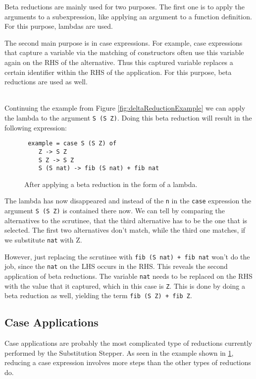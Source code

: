 Beta reductions are mainly used for two purposes.
The first one is to apply the arguments to a subexpression,
like applying an argument to a function definition.
For this purpose, lambdas are used.

The second main purpose is in case expressions.
For example, case expressions that capture a variable via the matching of constructors often use this variable again on the RHS of the alternative.
Thus this captured variable replaces a certain identifier within the RHS of the application.
For this purpose, beta reductions are used as well.

\ \\
Continuing the example from Figure \ref*{fig:deltaReductionExample} we can apply the lambda to the argument \texttt{S (S Z)}.
Doing this beta reduction will result in the following expression:

\begin{figure}[!ht]
\begin{verbatim}
 example = case S (S Z) of
    Z -> S Z
    S Z -> S Z
    S (S nat) -> fib (S nat) + fib nat
\end{verbatim}
    \caption{After applying a beta reduction in the form of a lambda.}
    \label{fig:betaReductionExample1}
\end{figure}

The lambda has now disappeared and instead of the \texttt{n} in the \texttt{case} expression the argument \texttt{S (S Z)} is contained there now.
We can tell by comparing the alternatives to the scrutinee,
that the third alternative has to be the one that is selected.
The first two alternatives don't match, while the third one matches, if we substitute \texttt{nat} with Z.

However, just replacing the scrutinee with \texttt{fib (S nat) + fib nat} won't do the job,
since the \texttt{nat} on the LHS occurs in the RHS.
This reveals the second application of beta reductions.
The variable \texttt{nat} needs to be replaced on the RHS with the value that it captured,
which in this case is \texttt{Z}.
This is done by doing a beta reduction as well,
yielding the term \texttt{fib (S Z) + fib Z}.

\subsection{Case Applications}
Case applications are probably the most complicated type of reductions currently performed by the Substitution Stepper.
As seen in the example shown in \ref*{fig:betaReductionExample1},
reducing a case expression involves more steps than the other types of reductions do.

